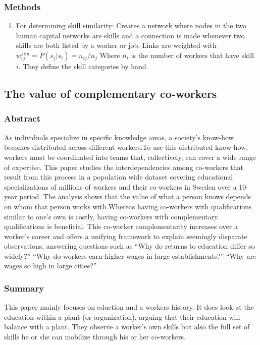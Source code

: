 \documentclass[12pt]{article}
\begin{document}
\subsubsection*{Methods}

\begin{enumerate}
    \item For determining skill similarity:  Creates a network where nodes in the two human capital networks are skills and a connection is made whenever two skills are both listed by a worker or job. Links are weighted with $w_{ij}^{sim} = P(s_j|s_i) = n_{ij}/n_j$ Where $n_i$ is the number of workers that have skill $i$. They define the skill categories by hand.
\end{enumerate}


\subsection*{The value of complementary co-workers\cite{value_of_complementarity}}

\subsubsection*{Abstract}
As individuals specialize in specific knowledge areas, a society's know-how becomes distributed across different workers.To use this distributed know-how, workers must be coordinated into teams that, collectively, can cover a wide range of expertise. This paper studies the interdependencies among co-workers that result from this process in a population wide dataset covering educational specializations of millions of workers and their co-workers in Sweden over a 10-year period. The analysis shows that the value of what a person knows depends on whom that person works with.Whereas having co-workers with qualifications similar to one's own is costly, having co-workers with complementary qualifications is beneficial. This co-worker complementarity increases over a worker's career and offers a unifying framework to explain seemingly disparate observations, answering questions such as “Why do returns to education differ so widely?” “Why do workers earn higher wages in large establishments?” “Why are wages so high in large cities?”
\subsubsection*{Summary}

This paper mainly focuses on eduction and a workers history. It does look at the education within a plant (or organization), arguing that their education will balance with a plant. They observe a worker's own skills but also the full set of skills he or she can mobilize through his or her co-workers.
\end{document}

